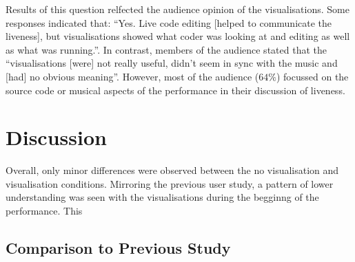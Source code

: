 Results of this question relfected the audience opinion of the visualisations. Some responses indicated that: ``Yes. Live code editing [helped to communicate the liveness], but visualisations showed what coder was looking at and editing as well as what was running.''. In contrast, members of the audience stated that the ``visualisations [were] not really useful, didn't seem in sync with the music and [had] no obvious meaning''. However, most of the audience ($64\%$) focussed on the source code or musical aspects of the performance in their discussion of liveness.

\section{Discussion}

Overall, only minor differences were observed between the no visualisation and visualisation conditions. Mirroring the previous user study, a pattern of lower understanding was seen with the visualisations during the begginng of the performance. This 




\subsection{Comparison to Previous Study}

\more




